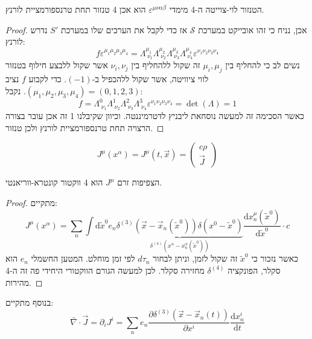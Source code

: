 \documentclass{tstextbook}
\begin{document}
\begin{proposition}
הטנזור לוי-צוייטה ה-4 מימדי \(\varepsilon^{\mu \nu \alpha \beta}\) הוא אכן 4 טנזור תחת טרנספורמציית לורנץ.

\end{proposition}
\begin{proof}
אכן, נניח כי זהו אובייקט במערכת \(\mathcal{S}\) אז כדי לקבל את הערכים שלו במערכת \(S'\) נדרש לורנץ:
$$f\varepsilon^{\mu_{1}\mu_{2}\mu_{3}\mu_{4}}=\Lambda^{\mu_{1}}_{\;\nu_{1}}\Lambda^{\mu_{2}}_{\;\nu_{2}}\Lambda^{\mu_{3}}_{\;\nu_{3}}\Lambda^{\mu_{4}}_{\; \nu_{4}}\varepsilon^{\nu_{1}\nu_{2}\nu_{3}\nu_{4}}$$
נשים לב כי להחליף בין \(\mu_{i},\mu_{j}\) זה שקול ללהחליף בין \(\nu_{i},\nu_{j}\) אשר שקול ללבצע חילוף בטנזור לווי ציוויטה, אשר שקול ללהכפיל ב-\((-1)\). 
כדי לקבוע \(f\) נציב \(\left( \mu_{1},\mu_{2},\mu_{3},\mu_{4} \right)=(0,1,2,3)\). נקבל:
$$f=\Lambda^0_{\;\nu_{1}}\Lambda^1_{\;\nu_{2}} \Lambda^2_{\;\nu_{3}}\Lambda^3_{\;\nu_{4}}\varepsilon^{\nu_{1}\nu_{2}\nu_{3}\nu_{4}}=\det\left( \Lambda\right)=1$$
כאשר הסכימה זה למעשה נוסחאת ליבניץ לדטרמיננטה. וכיוון שקיבלנו 1 זה אכן עובר בצורה הרצויה תחת טרנספורמציית לורנץ ולכן טנזור.

\end{proof}
\begin{definition}[4-זרם]
$$J^\mu\left( x^\alpha \right)=J^\mu\left( t,\vec{x} \right)=\begin{pmatrix}c\rho \\\vec{J}
\end{pmatrix}$$

\end{definition}
\begin{proposition}
הצפיפות זרם \(J^\mu\) הוא 4 ווקטור קונטרא-ווריאנטי.

\end{proposition}
\begin{proof}
מתקיים:
$$J^\mu\left( x^\alpha \right)=\sum_{n}\int \mathrm{d}\tilde{x}^0e_{n}\underbrace{ \delta^{(3)}\left( \vec{x}-\vec{x}_{n}\left( \tilde{x}^0 \right) \right)\delta\left( x^0-\tilde{x}^0 \right) }_{ \delta^{(4)}\left( x^\alpha-x_{n}^\alpha\left( \tilde{x}^0 \right) \right) } \frac{\mathrm{d}x_{n}^\mu\left( \tilde{x}^0 \right)}{\mathrm{d}\tilde{x}^0}\cdot c$$
כאשר נזכור כי \(\tilde{x}^0\) זה שקול לזמן, וניתן לבחור \(d\tau_{n}\) לפי זמן מוחלט. המטען החשמלי \(e_{n}\) הוא סקלר, הפונקציה \(\delta^{(4)}\) מחזירה סקלר. לכן למעשה הגורם הווקטורי היחידי פה זה ה-4 מהירות.

\end{proof}
בנוסף מתקיים:
$$\bar{\nabla} \cdot \vec{J}=\partial_{i}J^i = \sum_{n} e_{n} \frac{\partial \delta^{(3)}\left( \vec{x}-\vec{x}_{n}(t) \right)}{\partial x^i} \frac{\mathrm{d}x_{n}^i}{\mathrm{d}t}$$
\end{document}
